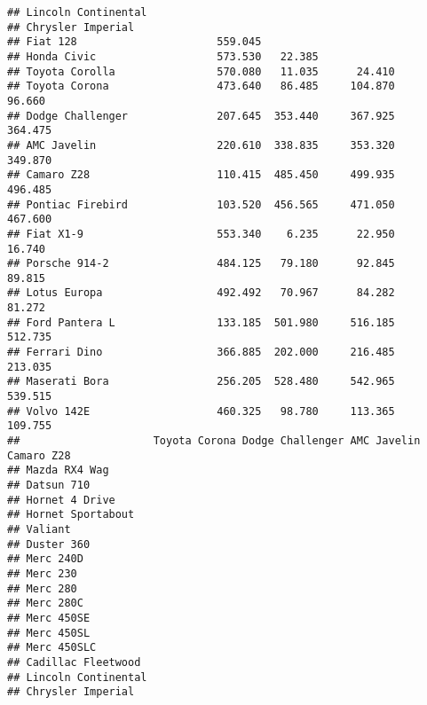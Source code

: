 \documentclass[]{book}
\begin{document}
\begin{verbatim}
## Lincoln Continental                                                      
## Chrysler Imperial                                                        
## Fiat 128                      559.045                                    
## Honda Civic                   573.530   22.385                           
## Toyota Corolla                570.080   11.035      24.410               
## Toyota Corona                 473.640   86.485     104.870         96.660
## Dodge Challenger              207.645  353.440     367.925        364.475
## AMC Javelin                   220.610  338.835     353.320        349.870
## Camaro Z28                    110.415  485.450     499.935        496.485
## Pontiac Firebird              103.520  456.565     471.050        467.600
## Fiat X1-9                     553.340    6.235      22.950         16.740
## Porsche 914-2                 484.125   79.180      92.845         89.815
## Lotus Europa                  492.492   70.967      84.282         81.272
## Ford Pantera L                133.185  501.980     516.185        512.735
## Ferrari Dino                  366.885  202.000     216.485        213.035
## Maserati Bora                 256.205  528.480     542.965        539.515
## Volvo 142E                    460.325   98.780     113.365        109.755
##                     Toyota Corona Dodge Challenger AMC Javelin Camaro Z28
## Mazda RX4 Wag                                                            
## Datsun 710                                                               
## Hornet 4 Drive                                                           
## Hornet Sportabout                                                        
## Valiant                                                                  
## Duster 360                                                               
## Merc 240D                                                                
## Merc 230                                                                 
## Merc 280                                                                 
## Merc 280C                                                                
## Merc 450SE                                                               
## Merc 450SL                                                               
## Merc 450SLC                                                              
## Cadillac Fleetwood                                                       
## Lincoln Continental                                                      
## Chrysler Imperial                                                        

\end{verbatim}
\end{document}
